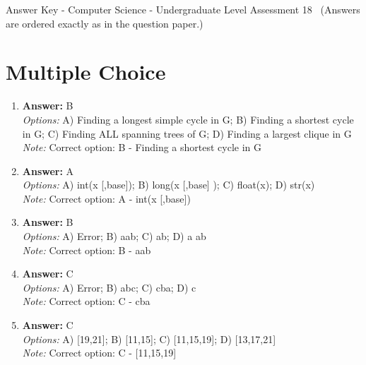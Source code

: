 \documentclass[12pt]{article}
\begin{document}
\begin{center}
Answer Key - Computer Science - Undergraduate Level Assessment 18 \
\small (Answers are ordered exactly as in the question paper.)
\end{center}

\section*{Multiple Choice}
\begin{enumerate}[label=\arabic*.]
\item \textbf{Answer:} B
\\ \textit{Options:} A) Finding a longest simple cycle in G; B) Finding a shortest cycle in G; C) Finding ALL spanning trees of G; D) Finding a largest clique in G
\\ \textit{Note:} Correct option: B - Finding a shortest cycle in G
\item \textbf{Answer:} A
\\ \textit{Options:} A) int(x [,base]); B) long(x [,base] ); C) float(x); D) str(x)
\\ \textit{Note:} Correct option: A - int(x [,base])
\item \textbf{Answer:} B
\\ \textit{Options:} A) Error; B) aab; C) ab; D) a ab
\\ \textit{Note:} Correct option: B - aab
\item \textbf{Answer:} C
\\ \textit{Options:} A) Error; B) abc; C) cba; D) c
\\ \textit{Note:} Correct option: C - cba
\item \textbf{Answer:} C
\\ \textit{Options:} A) [19,21]; B) [11,15]; C) [11,15,19]; D) [13,17,21]
\\ \textit{Note:} Correct option: C - [11,15,19]
\end{enumerate}
\end{document}
